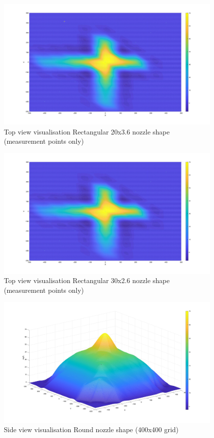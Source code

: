 \begin{figure}
    \centering
    \includegraphics[width=0.75\linewidth]{Images/Rec20_top_Mpoint.jpg}
    \caption{Top view visualisation Rectangular 20x3.6 nozzle shape (measurement points only)}
\end{figure}

\begin{figure}
    \centering
    \includegraphics[width=0.75\linewidth]{Images/Rec30_top_Mpoint.jpg}
    \caption{Top view visualisation Rectangular 30x2.6 nozzle shape (measurement points only)}
\end{figure}







\begin{figure}
    \centering
    \includegraphics[width=0.75\linewidth]{Images/Round_side_400.jpg}
    \caption{Side view visualisation Round nozzle shape (400x400 grid)}
\end{figure}

